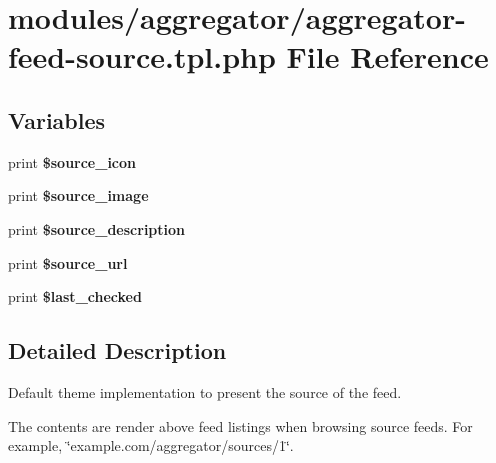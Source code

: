 \hypertarget{aggregator-feed-source_8tpl_8php}{
\section{modules/aggregator/aggregator-feed-source.tpl.php File Reference}
\label{aggregator-feed-source_8tpl_8php}
}
\subsection*{Variables}
\begin{CompactItemize}
\item 
\hypertarget{aggregator-feed-source_8tpl_8php_b68bdd58de0c58b7f693392cdaedd0c6}{
print \textbf{\$source\_\-icon}}
\label{aggregator-feed-source_8tpl_8php_b68bdd58de0c58b7f693392cdaedd0c6}

\item 
\hypertarget{aggregator-feed-source_8tpl_8php_f295e6279c4277c20165af3ddd0a49fd}{
print \textbf{\$source\_\-image}}
\label{aggregator-feed-source_8tpl_8php_f295e6279c4277c20165af3ddd0a49fd}

\item 
\hypertarget{aggregator-feed-source_8tpl_8php_88d3fc892cda0ae2d9785aa1baa64a53}{
print \textbf{\$source\_\-description}}
\label{aggregator-feed-source_8tpl_8php_88d3fc892cda0ae2d9785aa1baa64a53}

\item 
\hypertarget{aggregator-feed-source_8tpl_8php_c28b1457ba0a04cbe629056c40639fd5}{
print \textbf{\$source\_\-url}}
\label{aggregator-feed-source_8tpl_8php_c28b1457ba0a04cbe629056c40639fd5}

\item 
\hypertarget{aggregator-feed-source_8tpl_8php_95e757fc03ab209641c87deba540e3cf}{
print \textbf{\$last\_\-checked}}
\label{aggregator-feed-source_8tpl_8php_95e757fc03ab209641c87deba540e3cf}

\end{CompactItemize}


\subsection{Detailed Description}
Default theme implementation to present the source of the feed.

The contents are render above feed listings when browsing source feeds. For example, \char`\"{}example.com/aggregator/sources/1\char`\"{}.

